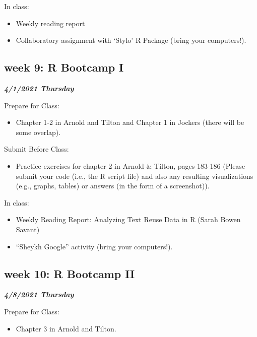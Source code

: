 \documentclass[
]{book}
\providecommand{\tightlist}{%
  \setlength{\itemsep}{0pt}\setlength{\parskip}{0pt}}
\begin{document}
In class:

\begin{itemize}
\tightlist
\item
  Weekly reading report
\item
  Collaboratory assignment with `Stylo' R Package (bring your computers!).
\end{itemize}

\hypertarget{week-9-r-bootcamp-i}{%
\subsection{week 9: R Bootcamp I}\label{week-9-r-bootcamp-i}}

\textbf{\emph{4/1/2021 Thursday}}

Prepare for Class:

\begin{itemize}
\tightlist
\item
  Chapter 1-2 in Arnold and Tilton and Chapter 1 in Jockers (there will be some overlap).
\end{itemize}

Submit Before Class:

\begin{itemize}
\tightlist
\item
  Practice exercises for chapter 2 in Arnold \& Tilton, pages 183-186 (Please submit your code (i.e., the R script file) and also any resulting visualizations (e.g., graphs, tables) or answers (in the form of a screenshot)).
\end{itemize}

In class:

\begin{itemize}
\tightlist
\item
  Weekly Reading Report: Analyzing Text Reuse Data in R (Sarah Bowen Savant)
\item
  ``Sheykh Google'' activity (bring your computers!).
\end{itemize}

\hypertarget{week-10-r-bootcamp-ii}{%
\subsection{week 10: R Bootcamp II}\label{week-10-r-bootcamp-ii}}

\textbf{\emph{4/8/2021 Thursday}}

Prepare for Class:

\begin{itemize}
\tightlist
\item
  Chapter 3 in Arnold and Tilton.
\end{itemize}
\end{document}
